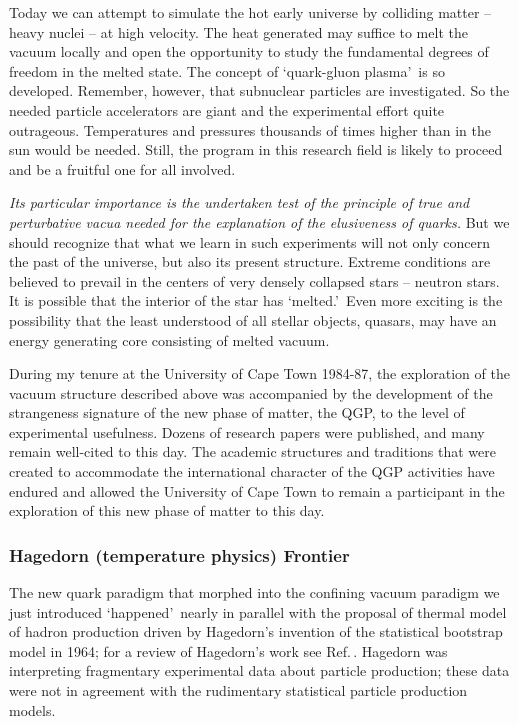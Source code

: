 \begin{mdframed}[linecolor=gray,roundcorner=12pt,backgroundcolor=Dandelion!15,linewidth=1pt,leftmargin=0cm,rightmargin=0cm,topline=true,bottomline=true,skipabove=12pt]
Today we can attempt to simulate the hot early universe by colliding matter -- heavy nuclei -- at high velocity. The heat generated may suffice to melt the vacuum locally and open the opportunity to study the fundamental degrees of freedom in the melted state. The concept of \lq quark-gluon plasma\rq\ is so developed. Remember, however, that subnuclear particles are investigated. So the needed particle accelerators are giant and the experimental effort quite outrageous. Temperatures and pressures thousands of times higher than in the sun would be needed. Still, the program in this research field is likely to proceed and be a fruitful one for all involved. 

\emph{Its particular importance is the undertaken test of the principle of true and perturbative vacua needed for the explanation of the elusiveness of quarks.} But we should recognize that what we learn in such experiments will not only concern the past of the universe, but also its present structure. Extreme conditions are believed to prevail in the centers of very densely collapsed stars -- neutron stars. It is possible that the interior of the star has \lq melted.\rq\ Even more exciting is the possibility that the least understood of all stellar objects, quasars, may have an energy generating core consisting of melted vacuum.
\end{mdframed}
\vskip 0.5cm

During my tenure at the University of Cape Town 1984-87, the exploration of the vacuum structure described above was accompanied by the development of the strangeness signature of the new phase of matter, the QGP, to the level of experimental usefulness. Dozens of research papers were published, and many remain well-cited to this day. The academic structures and traditions that were created to accommodate the international character of the QGP activities have endured and allowed the University of Cape Town to remain a participant in the exploration of this new phase of matter to this day.


\subsubsection{Hagedorn (temperature physics) Frontier}
The new quark paradigm that morphed into the confining vacuum paradigm we just introduced \lq happened\rq\ nearly in parallel with the proposal of thermal model of hadron production driven by Hagedorn\rq s invention of the statistical bootstrap model in 1964; for a review of Hagedorn\rq s work see Ref.\,\cite{Rafelski:2016hnq}. Hagedorn was interpreting fragmentary experimental data about particle production; these data were not in agreement with the rudimentary statistical particle production models. 

